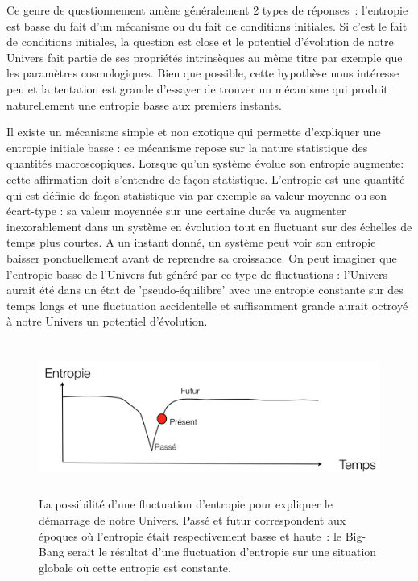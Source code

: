 Ce genre de questionnement amène généralement 2 types de réponses~: l'entropie est basse du fait d'un mécanisme ou du fait de conditions initiales. Si c'est le fait de conditions initiales, la question est close et le potentiel d'évolution de notre Univers fait partie de ses propriétés intrinsèques au même titre par exemple que les paramètres cosmologiques. Bien que possible, cette hypothèse nous intéresse peu et la tentation est grande d'essayer de trouver un mécanisme qui produit naturellement une entropie basse aux premiers instants.

Il existe un mécanisme simple et non exotique qui permette d'expliquer une entropie initiale basse : ce mécanisme repose sur la nature statistique des quantités macroscopiques. Lorsque qu'un système évolue son entropie augmente: cette affirmation doit s'entendre de façon statistique. L'entropie est une quantité qui est définie de façon statistique via par exemple sa valeur moyenne ou son écart-type : sa valeur moyennée sur une certaine durée va augmenter inexorablement dans un système en évolution tout en fluctuant sur des échelles de temps plus courtes. A un instant donné, un système peut voir son entropie baisser ponctuellement avant de reprendre sa croissance. On peut imaginer que l'entropie basse de l'Univers fut généré par ce type de fluctuations : l'Univers aurait été dans un état de 'pseudo-équilibre' avec une entropie constante sur des temps longs et une fluctuation accidentelle et suffisamment grande aurait octroyé à notre Univers un potentiel d'évolution.
\begin{figure}[htbp]
	\centering
		\includegraphics[height=5cm]{figs/fluctuation.png}
	\caption[fluctuation d'entropie]{La possibilité d'une fluctuation d'entropie pour expliquer le démarrage de notre Univers. Passé et futur correspondent aux époques où l'entropie était respectivement basse et haute~: le Big-Bang serait le résultat d'une fluctuation d'entropie sur une situation globale où cette entropie est constante.}
	\label{f:fluctuation}
\end{figure}

